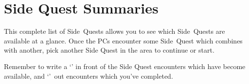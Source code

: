 \chapter{Side Quest Summaries}
\label{sqSummaries}

\begin{multicols}{2}

\noindent
This complete list of Side~Quests allows you to see which Side~Quests are available at a glance.
Once the PCs encounter some Side~Quest which combines with another, pick another Side Quest in the area to continue or start.

Remember to write a `\sqr' in front of the Side Quest encounters which have become available, and `'~out encounters which you've completed.

\end{multicols}


